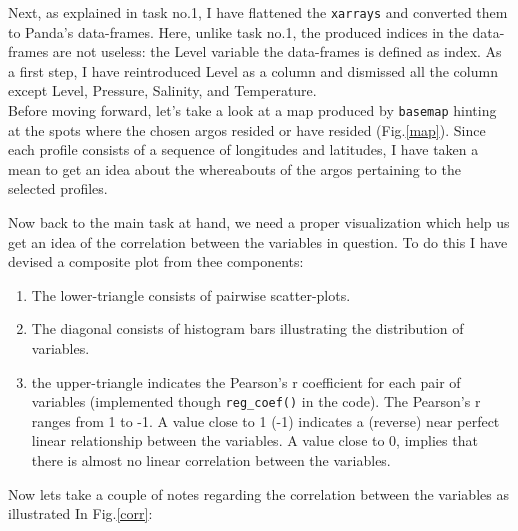 \documentclass[12pt]{article}
\begin{document}
Next, as explained in task no.1, I have flattened the \verb|xarrays| 
and converted them to Panda's data-frames. Here, unlike
task no.1, the produced indices in the data-frames are not useless: 
the Level variable the data-frames is defined as 
index. As a first step, I have reintroduced Level as a column and 
dismissed all the column except Level, Pressure, 
Salinity, and Temperature.\\

Before moving forward, let's take a look at a map produced by 
\verb|basemap| hinting at the spots where
the chosen argos resided or have resided (Fig.\ref{map}). 
Since each profile consists of a sequence of longitudes and 
latitudes,
I have taken a mean to get an idea about the whereabouts of 
the argos pertaining to the selected profiles.




    Now back to the main task at hand, we need a proper 
    visualization which help us get an idea of the correlation
    between the variables in question. To do this I have 
    devised a composite plot from thee components: 

    \begin{enumerate}
        \item The lower-triangle consists of pairwise scatter-plots.
        \item The diagonal consists of histogram bars illustrating 
        the distribution of variables.
        \item the upper-triangle indicates the Pearson's r 
        coefficient for each pair of variables 
        (implemented though \verb|reg_coef()| 
        in the code). The Pearson's r ranges from 1 to -1.
        A value close to 1 (-1) indicates a (reverse) near
        perfect linear relationship between the variables.
        A value close to 0, implies that there is almost no 
        linear correlation between the variables.
    \end{enumerate}



    Now lets take a couple of notes regarding the
    correlation between the variables as illustrated In
    Fig.\ref{corr}:
    
\end{document}

